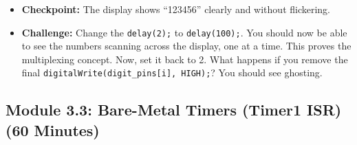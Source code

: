 \documentclass[11pt,a4paper]{article}
\begin{document}
\begin{itemize}
\begin{lstlisting}[caption={Code for Module 3.2: Software Multiplexing}]
    // 4. IMPORTANT: Turn the display OFF before changing the data.
    // This prevents ``ghosting'' where segments from the next digit
    // briefly appear on the current display.
    digitalWrite(digit_pins[i], HIGH);
  }
}
\end{lstlisting}
    \item \textbf{Checkpoint:} The display shows ``123456'' clearly and without flickering.
    \item \textbf{Challenge:} Change the \verb|delay(2);| to \verb|delay(100);|. You should now be able to see the numbers scanning across the display, one at a time. This proves the multiplexing concept. Now, set it back to 2. What happens if you remove the final \verb|digitalWrite(digit_pins[i], HIGH);|? You should see ghosting.
\end{itemize}
\newpage
\subsection*{Module 3.3: Bare-Metal Timers (Timer1 ISR) (60 Minutes)}
\end{document}
